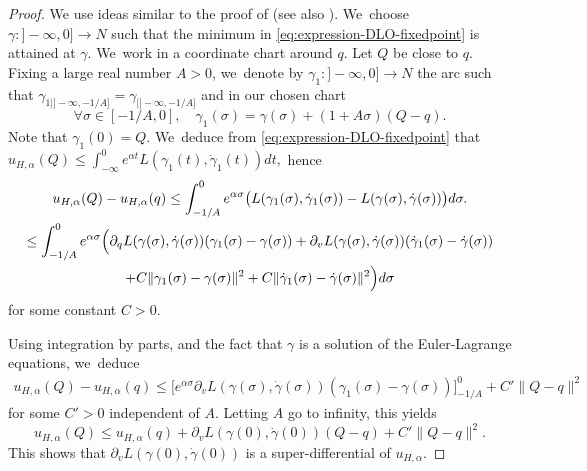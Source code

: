 \documentclass[JEP,XML,SOM,Unicode,NoFloatCountersInSection,published]{cedram}
\theoremstyle{definition}
\begin{document}
\begin{proof} We use ideas similar to the proof of \cite[Prop.\,4.11.1]{Fathi-book} (see also \cite{Bernard2008}). We~choose $\gamma:{}]-\infty, 0]\to N$ such that the minimum in \eqref{eq:expression-DLO-fixedpoint} is attained at $\gamma$. We~work in a coordinate chart around $q$. Let $Q$ be close to $q$.
Fixing a large real number $A>0$, we~denote by $\gamma_1:{}]-\infty, 0]\to N$ the arc such that $\gamma_{1|]-\infty, -1/A]}=\gamma_{|]-\infty, -1/A]}$ and in our chosen chart
\[
\forall\sigma\in [-1/A, 0],\quad \gamma_1(\sigma)=\gamma(\sigma)+(1+A\sigma)(Q-q).
\]
Note that $\gamma_1(0)=Q$. We~deduce from \eqref{eq:expression-DLO-fixedpoint} that $ u_{H, \alpha}(Q)\leq \int_{-\infty}^0 e^{\alpha t}L(\gamma_1 (t), \dot \gamma_1 (t))dt ,$
hence
\begin{multline*}
u_{H, \alpha}(Q) - u_{H, \alpha}(q) \leq \int_{-1/A}^0e^{\alpha \sigma}\bigl(L(\gamma_1(\sigma), \dot\gamma_1(\sigma))-L(\gamma(\sigma), \dot\gamma(\sigma))\bigr)d\sigma.\\
\leq \int_{-1/A}^0e^{\alpha \sigma}\Bigl(\partial_qL(\gamma(\sigma), \dot\gamma(\sigma))(\gamma_1(\sigma)-\gamma(\sigma))+\partial_vL(\gamma(\sigma), \dot\gamma(\sigma))(\dot\gamma_1(\sigma)-\dot\gamma(\sigma))\\
+C\| \gamma_1(\sigma)-\gamma(\sigma)\|^2+C\| \dot\gamma_1(\sigma)-\dot\gamma(\sigma)\|^2\Bigr)d\sigma
\end{multline*}
for some constant $C>0$.

Using integration by parts, and the fact that $\gamma$ is a solution of the Euler-Lagrange equations, we~deduce
\begin{align*} u_{H, \alpha}(Q)- u_{H, \alpha}(q)
\leq \Big[ e^{\alpha\sigma}\partial_vL(\gamma(\sigma), \dot\gamma(\sigma))(\gamma_1(\sigma)-\gamma(\sigma))\Big]_{-1/A}^0+C'\| Q-q\|^2
\end{align*}
for some $C'>0$ independent of $A$. Letting $A$ go to infinity, this yields
\[
u_{H, \alpha}(Q)\leq u_{H, \alpha}(q)+\partial_vL(\gamma(0), \dot\gamma(0))(Q-q)+C'\| Q-q\|^2.
\]
This shows that $\partial_vL(\gamma(0), \dot\gamma(0))$ is a super-differential of $u_{H, \alpha}$.
\end{proof}
\end{document}
